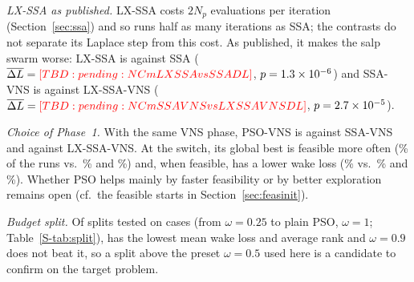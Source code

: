 \emph{LX-SSA as published.} LX-SSA costs $2N_p$ evaluations per iteration (Section~\ref{sec:ssa}) and so runs half as many iterations as SSA; the contrasts do not separate its Laplace step from this cost. As published, it makes the salp swarm worse: LX-SSA is \NAblLXSSAvsSSA{} against SSA ($\overline{\Delta L}=\NCmLXSSAvsSSADL$, $p=1.3\times10^{-6}$) and SSA-VNS is \NAblSSAVNSvsLXSSAVNS{} against LX-SSA-VNS ($\overline{\Delta L}=\NCmSSAVNSvsLXSSAVNSDL$, $p=2.7\times10^{-5}$).

\emph{Choice of Phase~1.} With the same VNS phase, PSO-VNS is \NAblPSOVNSvsSSAVNS{} against SSA-VNS and \NAblPSOVNSvsLXSSAVNS{} against LX-SSA-VNS. At the switch, its global best is feasible more often (\NSwitchFeasPSOVNS\% of the runs vs.\ \NSwitchFeasSSAVNS\% and \NSwitchFeasLXSSAVNS\%) and, when feasible, has a lower wake loss (\NSwitchLossPSOVNS\% vs.\ \NSwitchLossSSAVNS\% and \NSwitchLossLXSSAVNS\%). Whether PSO helps mainly by faster feasibility or by better exploration remains open (cf.\ the feasible starts in Section~\ref{sec:feasinit}).

\emph{Budget split.}\label{sec:split} Of \NSplitNSettings{} splits tested on \NSplitCases{} cases (from $\omega=0.25$ to plain PSO, $\omega=1$; Table~\ref{S-tab:split}), \NSplitBestSetting{} has the lowest mean wake loss and average rank and $\omega=0.9$ does not beat it, so a split above the preset $\omega=0.5$ used here is a candidate to confirm on the target problem.
